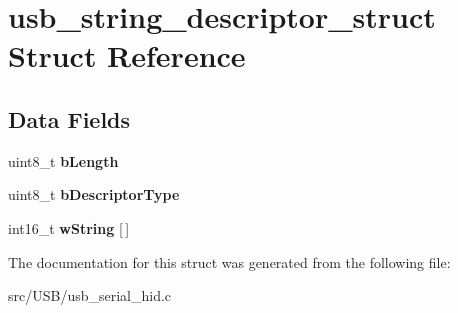 \hypertarget{structusb__string__descriptor__struct}{\section{usb\+\_\+string\+\_\+descriptor\+\_\+struct Struct Reference}
\label{structusb__string__descriptor__struct}
}
\subsection*{Data Fields}
\begin{DoxyCompactItemize}
\item 
\hypertarget{structusb__string__descriptor__struct_a1deca1f1d6e5815b290e6e1015bce5b8}{uint8\+\_\+t {\bfseries b\+Length}}\label{structusb__string__descriptor__struct_a1deca1f1d6e5815b290e6e1015bce5b8}

\item 
\hypertarget{structusb__string__descriptor__struct_a67d7027b9eb9ed268d28e84fbc675707}{uint8\+\_\+t {\bfseries b\+Descriptor\+Type}}\label{structusb__string__descriptor__struct_a67d7027b9eb9ed268d28e84fbc675707}

\item 
\hypertarget{structusb__string__descriptor__struct_a73b6a1a52dd1abac3cef0d39a6e340a5}{int16\+\_\+t {\bfseries w\+String} \mbox{[}$\,$\mbox{]}}\label{structusb__string__descriptor__struct_a73b6a1a52dd1abac3cef0d39a6e340a5}

\end{DoxyCompactItemize}


The documentation for this struct was generated from the following file\+:\begin{DoxyCompactItemize}
\item 
src/\+U\+S\+B/usb\+\_\+serial\+\_\+hid.\+c\end{DoxyCompactItemize}
